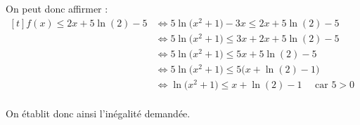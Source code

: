 \begin{enumerate}
\begin{enumerate}
On peut donc affirmer :\quad $\begin{aligned}[t]
	f(x) \leqslant 2x + 5\ln(2) - 5
	&\iff 5\ln\big(x^2 + 1\big) - 3x \leqslant 2x + 5\ln(2) - 5\\
	&\iff 5\ln\big(x^2 + 1\big) \leqslant 3x + 2x + 5\ln(2) - 5\\
	&\iff 5\ln\big(x^2 + 1\big) \leqslant 5x + 5\ln(2) - 5\\
	&\iff 5\ln\big(x^2 + 1\big) \leqslant 5\big(x + \ln(2) - 1\big)\\
	&\iff \ln\big(x^2 + 1\big) \leqslant x + \ln(2) - 1\quad \text{ car } 5 > 0\\
\end{aligned}$

On établit donc ainsi l'inégalité demandée.
	\end{enumerate}
\end{enumerate}
